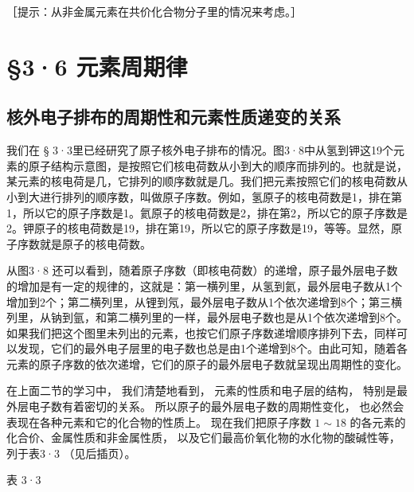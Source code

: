 ［提示：从非金属元素在共价化合物分子里的情况来考虑。］

\section{§3·6 元素周期律}

\subsection{核外电子排布的周期性和元素性质递变的关系}

我们在 §
3·3里已经研究了原子核外电子排布的情况。图3·8中从氢到钾这19个元素的原子结构示意图，是按照它们核电荷数从小到大的顺序而排列的。也就是说，某元素的核电荷是几，它排列的顺序数就是几。我们把元素按照它们的核电荷数从小到大进行排列的顺序数，叫做原子序数。例如，氢原子的核电荷数是1，排在第1，所以它的原子序数是1。氦原子的核电荷数是2，排在第2，所以它的原子序数是2。钾原子的核电荷数是19，排在第19，所以它的原子序数是19，等等。显然，原子序数就是原子的核电荷数。

从图3·8
还可以看到，随着原子序数（即核电荷数）的递增，原子最外层电子数的增加是有一定的规律的，这就是：第一横列里，从氢到氦，最外层电子数从1个增加到2个；第二横列里，从锂到氖，最外层电子数从1个依次递增到8个；第三横列里，从钠到氩，和第二横列里的一样，最外层电子数也是从1个依次递增到8个。如果我们把这个图里未列出的元素，也按它们原子序数递增顺序排列下去，同样可以发现，它们的最外电子层里的电子数也总是由1个递增到8个。由此可知，随着各元素的原子序数的依次递增，它们的原子的最外层电子数就呈现出周期性的变化。

在上面二节的学习中， 我们清楚地看到， 元素的性质和电子层的结构，
特别是最外层电子数有着密切的关系。 所以原子的最外层电子数的周期性变化，
也必然会表现在各种元素和它的化合物的性质上。 现在我们把原子序数
\(1 \sim 18\) 的各元素的化合价、金属性质和非金属性质，
以及它们最高价氧化物的水化物的酸碱性等， 列于表3·3 （见后插页）。

表 3·3

